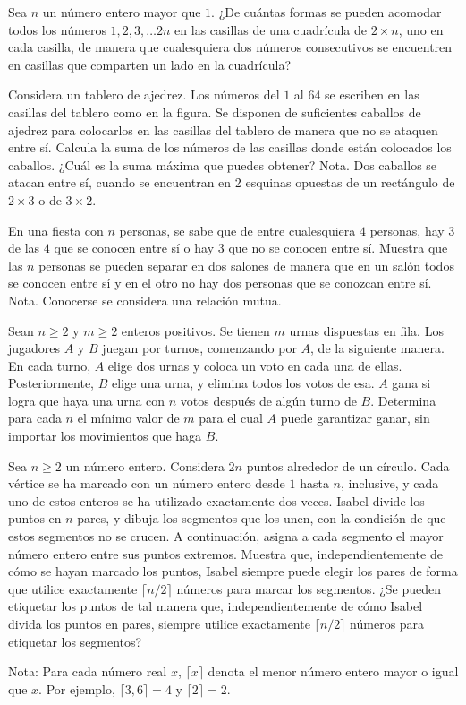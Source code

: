\documentclass[11pt]{scrartcl}
\begin{document}
\begin{problem}
    [2006/3]
    Sea $n$ un número entero mayor que $1$. ¿De cuántas formas se pueden acomodar todos los números $1,2,3,\dots 2n$ en las casillas de una cuadrícula de $2\times n$, uno en cada casilla, de manera que cualesquiera dos números consecutivos se encuentren en casillas que comparten un lado en la cuadrícula?
\end{problem}
\begin{problem}
    [2008/3]
    Considera un tablero de ajedrez. Los números del $1$ al $64$ se escriben en las casillas del
tablero como en la figura. Se disponen de suficientes caballos de ajedrez para colocarlos en las casillas del tablero de
manera que no se ataquen entre sí. Calcula la suma de los números de las casillas donde
están colocados los caballos. ¿Cuál es la suma máxima que puedes obtener? Nota. Dos
caballos se atacan entre sí, cuando se encuentran en 2 esquinas opuestas de un rectángulo
de $2\times 3$ o de $3 \times 2$.
\end{problem}
\begin{problem}
    [2009/6]
    En una fiesta con $n$ personas, se sabe que de entre cualesquiera $4$ personas, hay $3$ de las
$4$ que se conocen entre sí o hay $3$ que no se conocen entre sí. Muestra que las $n$ personas
se pueden separar en dos salones de manera que en un salón todos se conocen entre sí y
en el otro no hay dos personas que se conozcan entre sí.
Nota. Conocerse se considera una relación mutua.
\end{problem}
\begin{problem}
    [2017/6] 
    Sean $n \geq 2$ y $m \geq 2$ enteros positivos. Se tienen $m$ urnas dispuestas en fila. Los jugadores
$A$ y $B$ juegan por turnos, comenzando por $A$, de la siguiente manera. En cada turno, $A$
elige dos urnas y coloca un voto en cada una de ellas. Posteriormente, $B$ elige una urna,
y elimina todos los votos de esa. $A$ gana si logra que haya una urna con $n$ votos después
de algún turno de $B$. Determina para cada $n$ el mínimo valor de $m$ para el cual $A$ puede
garantizar ganar, sin importar los movimientos que haga $B$.
\end{problem}
\begin{problem}
    [2019/3] 
    Sea $n\geq 2$ un número entero. Considera $2n$ puntos alrededor de un círculo. Cada vértice se ha marcado con un número entero desde $1$ hasta $n$, inclusive, y cada uno de estos enteros se ha utilizado exactamente dos veces. Isabel divide los puntos en $n$ pares, y dibuja los segmentos que los unen, con la condición de que estos segmentos no se crucen. A continuación, asigna a cada segmento el mayor número entero entre sus puntos extremos. Muestra que, independientemente de cómo se hayan marcado los puntos, Isabel siempre puede elegir los pares de forma que utilice exactamente $\lceil n/2\rceil$ números para marcar los segmentos. ¿Se pueden etiquetar los puntos de tal manera que, independientemente de cómo Isabel divida los puntos en pares, siempre utilice exactamente $\lceil n/2\rceil$ números para etiquetar los segmentos?

Nota: Para cada número real $x$, $\lceil x\rceil$ denota el menor número entero mayor o igual que $x$. Por ejemplo, $\lceil 3,6\rceil=4$ y $\lceil 2\rceil=2$.
\end{problem}
\end{document}
